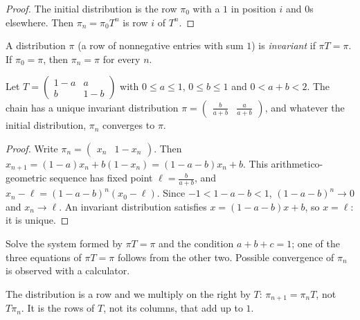 \begin{proof}
The initial distribution is the row $\pi_0$ with a $1$ in position $i$ and $0$s elsewhere. Then $\pi_n=\pi_0T^n$ is row $i$ of $T^n$.
\end{proof}
\begin{definition}
A distribution $\pi$ (a row of nonnegative entries with sum $1$) is \emph{invariant} if $\pi T=\pi$. If $\pi_0=\pi$, then $\pi_n=\pi$ for every $n$.
\end{definition}
\begin{theorem}
Let $T=\begin{pmatrix}1-a&a\\b&1-b\end{pmatrix}$ with $0\le a\le1$, $0\le b\le1$ and $0<a+b<2$. The chain has a unique invariant distribution $\pi=\begin{pmatrix}\frac b{a+b}&\frac a{a+b}\end{pmatrix}$, and whatever the initial distribution, $\pi_n$ converges to $\pi$.
\end{theorem}
\begin{proof}
Write $\pi_n=\begin{pmatrix}x_n&1-x_n\end{pmatrix}$. Then $x_{n+1}=(1-a)x_n+b(1-x_n)=(1-a-b)x_n+b$. This arithmetico-geometric sequence has fixed point $\ell=\frac b{a+b}$, and $x_n-\ell=(1-a-b)^n(x_0-\ell)$. Since $-1<1-a-b<1$, $(1-a-b)^n\to0$ and $x_n\to\ell$. An invariant distribution satisfies $x=(1-a-b)x+b$, so $x=\ell$: it is unique.
\end{proof}
\begin{method}
Solve the system formed by $\pi T=\pi$ and the condition $a+b+c=1$; one of the three equations of $\pi T=\pi$ follows from the other two. Possible convergence of $\pi_n$ is observed with a calculator.
\end{method}
\begin{pitfall}
The distribution is a row and we multiply on the right by $T$: $\pi_{n+1}=\pi_nT$, not $T\pi_n$. It is the rows of $T$, not its columns, that add up to $1$.
\end{pitfall}

\mxnewpage

